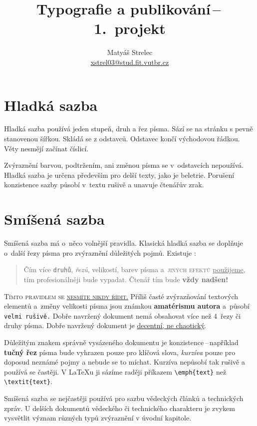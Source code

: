 \documentclass[hidelinks, 10pt, twocolumn]{article}
\begin{document}
\title{Typografie a publikování\,{}--\,{}1.\ projekt}
\author{Matyáš Strelec \\ \href{mailto:xstrel03@stud.fit.vutbr.cz}{xstrel03@stud.fit.vutbr.cz}}
\date{}

\maketitle

\section{Hladká sazba}

Hladká sazba používá jeden stupeň, druh a řez písma.
Sází se na stránku s pevně stanovenou šířkou.
Skládá se z odstavců. Odstavec končí východovou řádkou.
Věty nesmějí začínat číslicí.
\par
Zvýraznění barvou, podtržením, ani změnou písma se v~odstavcích nepoužívá.
Hladká sazba je určena především pro delší texty, jako je beletrie.
Porušení konzistence sazby působí v~textu rušivě a unavuje čtenářův zrak.

\section{Smíšená sazba}

Smíšená sazba má o~něco volnější pravidla.
Klasická hladká sazba se doplňuje o~další řezy písma pro zvýraznění důležitých pojmů.
Existuje :

\begin{quotation}
    Čím více \texttt{druhů}, \textit{řezů}, {\tiny{velikostí}}, {\color{green}
    barev} písma a~\textsc{\color{blue}jiných efektů} \underline{použijeme},
    {\color{red}tím profesionálněji} bude {\selectfont{dokument}} vypadat.
    Čtenář tím bude \textbf{\Huge{vždy nadšen!}}
\end{quotation}

\textsc{Tímto pravidlem se \underline{nesmíte nikdy řídit.}}
Příliš časté zvýrazňování textových elementů a~změny {\scriptsize{velikosti}} písma jsou
známkou \textbf{amatérismu autora} a~působí \texttt{velmi rušivě.}
Dobře navržený dokument nemá obsahovat více než 4~řezy či druhy písma.
Dobře navržený dokument je \underline{decentní, ne chaotický}.
\par
Důležitým znakem správně vysázeného dokumentu je konzistence\,{}--\,{}například \textbf{tučný řez}
písma bude vyhrazen pouze pro klíčová slova, \textit{kurzíva} pouze pro doposud neznámé pojmy a nebude se to míchat.
Kurzíva nepůsobí tak rušivě a používá se častěji.
V \LaTeX{}u ji sázíme raději příkazem \verb|\emph{text}| než \verb|\textit{text}|.
\par
Smíšená sazba se nejčastěji používá pro sazbu vědeckých článků a technických zpráv.
U delších dokumentů vědeckého či technického charakteru je zvykem vysvětlit význam různých typů zvýraznění v úvodní kapitole.
\end{document}
